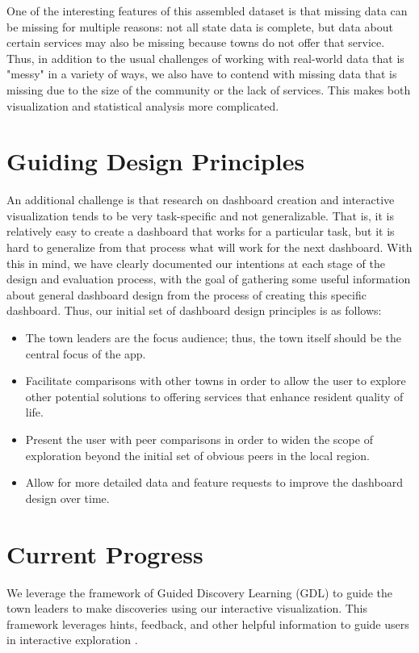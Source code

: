 \documentclass[10pt]{article}\usepackage[]{graphicx}\usepackage[]{color}
\begin{document}
One of the interesting features of this assembled dataset is that missing data can be missing for multiple reasons: not all state data is complete, but data about certain services may also be missing because towns do not offer that service.
Thus, in addition to the usual challenges of working with real-world data that is "messy" in a variety of ways, we also have to contend with missing data that is missing due to the size of the community or the lack of services. This makes both visualization and statistical analysis more complicated.

\section{Guiding Design Principles}
An additional challenge is that research on dashboard creation and interactive visualization tends to be very task-specific and not generalizable. That is, it is relatively easy to create a dashboard that works for a particular task, but it is hard to generalize from that process what will work for the next dashboard. With this in mind, we have clearly documented our intentions at each stage of the design and evaluation process, with the goal of gathering some useful information about general dashboard design from the process of creating this specific dashboard.
Thus, our initial set of dashboard design principles is as follows: 
\begin{itemize}
\item The town leaders are the focus audience; thus, the town itself should be the central focus of the app.
\item Facilitate comparisons with other towns in order to allow the user to explore other potential solutions to offering services that enhance resident quality of life.
\item Present the user with peer comparisons in order to widen the scope of exploration beyond the initial set of obvious peers in the local region.
\item Allow for more detailed data and feature requests to improve the dashboard design over time.
\end{itemize}


\section{Current Progress}
We leverage the framework of Guided Discovery Learning (GDL) to guide the town leaders to make discoveries using our interactive visualization. This framework leverages hints, feedback, and other helpful information to guide users in interactive exploration \cite{dedonno}.
\end{document}
